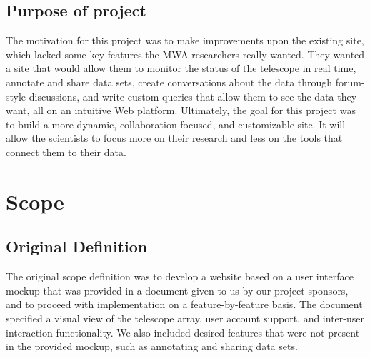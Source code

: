 \documentclass[12pt]{article}
\begin{document}
\begin{spacing}{1.5}
\subsection{Purpose of project}
The motivation for this project was to make improvements upon the existing site, which lacked some key features the MWA researchers really wanted. They wanted a site that would allow them to monitor the status of the telescope in real time, annotate and share data sets, create conversations about the data through forum-style discussions, and write custom queries that allow them to see the data they want, all on an intuitive Web platform. Ultimately, the goal for this project was to build a more dynamic, collaboration-focused, and customizable site. It will allow the scientists to focus more on their research and less on the tools that connect them to their data.

\section{Scope}
\subsection{Original Definition}
The original scope definition was to develop a website based on a user interface mockup that was provided in a document given to us by our project sponsors, and to proceed with implementation on a feature-by-feature basis. The document specified a visual view of the telescope array, user account support, and inter-user interaction functionality. We also included desired features that were not present in the provided mockup, such as annotating and sharing data sets.


\end{spacing}
\end{document}
